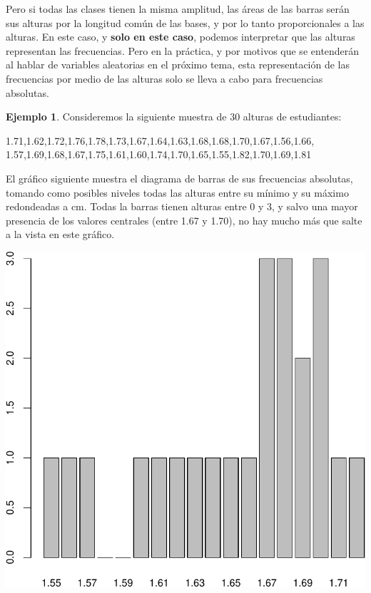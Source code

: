 \documentclass[
]{book}
\newenvironment{Shaded}{\begin{snugshade}}{\end{snugshade}}
\newcommand{\FloatTok}[1]{\textcolor[rgb]{0.00,0.00,0.81}{#1}}
\newcommand{\NormalTok}[1]{#1}
\theoremstyle{definition}
\theoremstyle{definition}
\newtheorem{example}{Ejemplo}[chapter]
\theoremstyle{definition}
\theoremstyle{definition}
\theoremstyle{remark}
\begin{document}
Pero si todas las clases tienen la misma amplitud, las áreas de las barras serán sus alturas por la longitud común de las bases, y por lo tanto proporcionales a las alturas. En este caso, y \textbf{solo en este caso}, podemos interpretar que las alturas representan las frecuencias. Pero en la práctica, y por motivos que se entenderán al hablar de variables aleatorias en el próximo tema, esta representación de las frecuencias por medio de las alturas solo se lleva a cabo para frecuencias absolutas.

\begin{example}
\protect\hypertarget{exm:unnamed-chunk-280}{}\label{exm:unnamed-chunk-280}Consideremos la siguiente muestra de 30 alturas de estudiantes:
\end{example}

\begin{Shaded}
\begin{Highlighting}[]
\FloatTok{1.71}\NormalTok{,}\FloatTok{1.62}\NormalTok{,}\FloatTok{1.72}\NormalTok{,}\FloatTok{1.76}\NormalTok{,}\FloatTok{1.78}\NormalTok{,}\FloatTok{1.73}\NormalTok{,}\FloatTok{1.67}\NormalTok{,}\FloatTok{1.64}\NormalTok{,}\FloatTok{1.63}\NormalTok{,}\FloatTok{1.68}\NormalTok{,}\FloatTok{1.68}\NormalTok{,}\FloatTok{1.70}\NormalTok{,}\FloatTok{1.67}\NormalTok{,}\FloatTok{1.56}\NormalTok{,}\FloatTok{1.66}\NormalTok{,}
\FloatTok{1.57}\NormalTok{,}\FloatTok{1.69}\NormalTok{,}\FloatTok{1.68}\NormalTok{,}\FloatTok{1.67}\NormalTok{,}\FloatTok{1.75}\NormalTok{,}\FloatTok{1.61}\NormalTok{,}\FloatTok{1.60}\NormalTok{,}\FloatTok{1.74}\NormalTok{,}\FloatTok{1.70}\NormalTok{,}\FloatTok{1.65}\NormalTok{,}\FloatTok{1.55}\NormalTok{,}\FloatTok{1.82}\NormalTok{,}\FloatTok{1.70}\NormalTok{,}\FloatTok{1.69}\NormalTok{,}\FloatTok{1.81}
\end{Highlighting}
\end{Shaded}

El gráfico siguiente muestra el diagrama de barras de sus frecuencias absolutas, tomando como posibles niveles todas las alturas entre su mínimo y su máximo redondeadas a cm. Todas la barras tienen alturas entre 0 y 3, y salvo una mayor presencia de los valores centrales (entre 1.67 y 1.70), no hay mucho más que salte a la vista en este gráfico.

\begin{center}\includegraphics[width=0.6\linewidth]{INREMDN_files/figure-latex/unnamed-chunk-282-1} \end{center}
\end{document}

